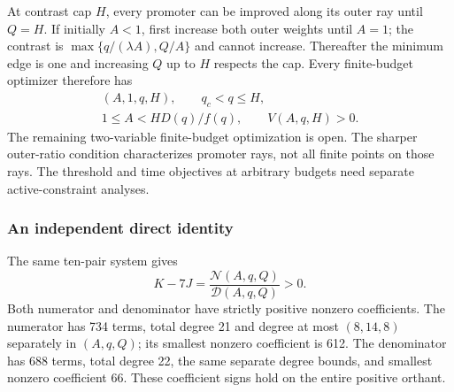 \documentclass[aps,pre,reprint,amsmath,amssymb,longbibliography]{revtex4-2}
\begin{document}
At contrast cap $H$, every promoter can be improved along its outer ray
until $Q=H$. If initially $A<1$, first increase both outer weights until
$A=1$; the contrast is $\max\{q/(\lambda A),Q/A\}$ and cannot increase.
Thereafter the minimum edge is one and increasing $Q$ up to $H$ respects
the cap. Every finite-budget optimizer therefore has
\begin{equation}
 \begin{gathered}
 (A,1,q,H),\qquad q_c<q\le H,\\
 1\le A<H D(q)/f(q),\qquad V(A,q,H)>0.
 \end{gathered}
\end{equation}
The remaining two-variable finite-budget optimization is open. The sharper
outer-ratio condition characterizes promoter rays, not all finite points
on those rays. The threshold and time objectives at arbitrary budgets need separate active-constraint analyses.

\subsubsection*{An independent direct identity}
The same ten-pair system gives
\begin{equation}
 K-7J=\frac{\mathscr N(A,q,Q)}{\mathscr D(A,q,Q)}>0.
 \label{app:path-p5-certificate}
\end{equation}
Both numerator and denominator have strictly positive nonzero
coefficients. The numerator has 734 terms, total degree 21 and
degree at most $(8,14,8)$ separately in $(A,q,Q)$; its smallest nonzero
coefficient is 612. The denominator has 688 terms, total degree 22,
the same separate degree bounds, and smallest nonzero coefficient 66.
These coefficient signs hold on the entire positive orthant.
\end{document}
